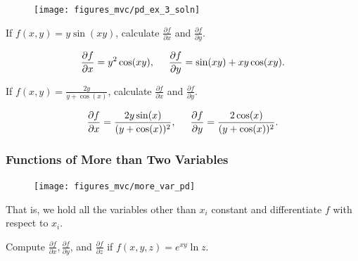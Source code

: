 \documentclass[12pt,letterpaper,reqno]{article}
\numberwithin{equation}{section}
\begin{document}
{\begin{figure}[h]
	\begin{center}
		\texttt{[image: figures\_mvc/pd\_ex\_3\_soln]}
	\end{center}
\end{figure}

\begin{exercise}
If $f(x,y)=y\sin(xy)$, calculate $\frac{\partial f}{\partial x}$ and $\frac{\partial f}{\partial y}$.	
\end{exercise}

{\color{red}
\begin{solution}
	\begin{align*}
		\frac{\partial f}{\partial x}=y^2\cos(xy), \hspace{0.5cm}
	\frac{\partial f}{\partial y}=\sin(xy)+xy\cos(xy).
	\end{align*}	
\end{solution}}

 \begin{exercise}
If $f(x,y)=\frac{2y}{y+\cos(x)}$, calculate $\frac{\partial f}{\partial x}$ and $\frac{\partial f}{\partial y}$.	
\end{exercise}

{\color{red}\begin{solution}
	\begin{align*}
		\frac{\partial f}{\partial x}=\frac{2y\sin(x)}{(y+\cos(x))^2}, \hspace{0.5cm}
	\frac{\partial f}{\partial y}=\frac{2\cos(x)}{(y+\cos(x))^2}.
	\end{align*}	
\end{solution}}


\subsubsection{Functions of More than Two Variables}
\begin{figure}[h]
	\begin{center}
		\texttt{[image: figures\_mvc/more\_var\_pd]}
	\end{center}
\end{figure}
That is, we hold all the variables other than $x_i$ constant and differentiate $f$ with respect to $x_i$.

\begin{exercise}
Compute $\frac{\partial f}{\partial x}, \frac{\partial f}{\partial y}$, and  $\frac{\partial f}{\partial z}$ if $f(x,y,z)=e^{xy}\ln z$. 	
\end{exercise}

}
\end{document}
